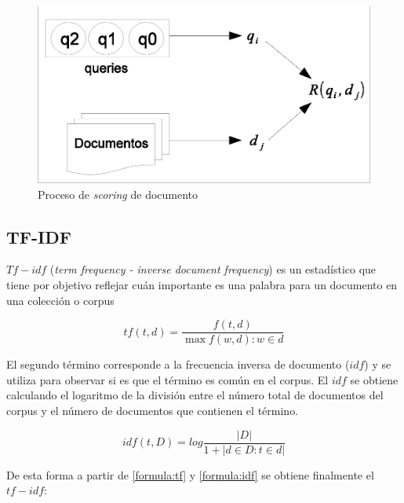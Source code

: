 \begin{figure}[!th]
\centering
\includegraphics[scale=.75]{images/ranking_process.eps}
\caption{Proceso de \textit{scoring} de documento}
\label{fig:ranking_process}
\end{figure}

\subsection{TF-IDF}
\label{marco:tfi-df}
$Tf-idf$ (\textit{term frequency - inverse document frequency}) es un estadístico que tiene por objetivo reflejar cuán importante es una palabra para un documento en una colección o corpus %

\begin{equation}
\label{formula:tf}
tf(t,d) = \dfrac{f(t,d) }{ \max{f(w,d) : w \in d}}
\end{equation}

El segundo término corresponde a la frecuencia inversa de documento ($idf$) y se utiliza para observar si es que el término es común en el corpus. El $idf$ se obtiene calculando el logaritmo de la división entre el número total de documentos del corpus y el número de documentos que contienen el término.

\begin{equation}
\label{formula:idf}
idf(t,D) = log \frac{ |D| }{1 + |{d \in D : t \in d}|}
\end{equation}

De esta forma a partir de \eqref{formula:tf} y \eqref{formula:idf} se obtiene finalmente el $tf-idf$: 


